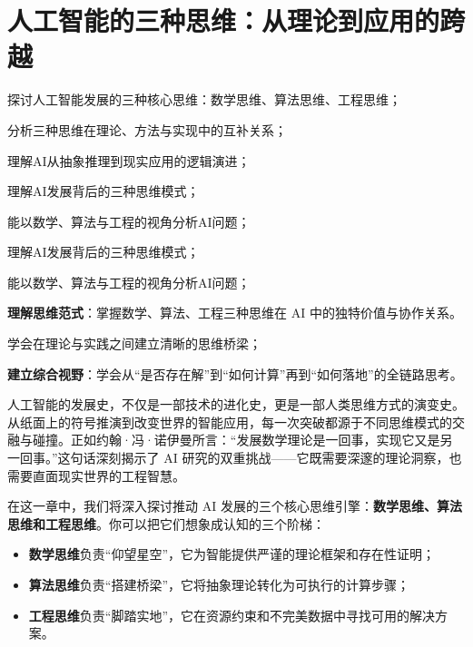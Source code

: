 \chapter{人工智能的三种思维：从理论到应用的跨越}



\begin{introduction}
  \item 探讨人工智能发展的三种核心思维：数学思维、算法思维、工程思维；
  \item 分析三种思维在理论、方法与实现中的互补关系；
  \item 理解AI从抽象推理到现实应用的逻辑演进；
  \item  理解AI发展背后的三种思维模式；
  \item 能以数学、算法与工程的视角分析AI问题；
\end{introduction}

\begin{introduction}
  \item 理解AI发展背后的三种思维模式；
  \item 能以数学、算法与工程的视角分析AI问题；
  \item \textbf{理解思维范式}：掌握数学、算法、工程三种思维在 AI 中的独特价值与协作关系。 
  \item 学会在理论与实践之间建立清晰的思维桥梁；
  \item \textbf{建立综合视野}：学会从“是否存在解”到“如何计算”再到“如何落地”的全链路思考。
  \item   \item 
\end{introduction}

人工智能的发展史，不仅是一部技术的进化史，更是一部人类思维方式的演变史。从纸面上的符号推演到改变世界的智能应用，每一次突破都源于不同思维模式的交融与碰撞。正如约翰·冯·诺伊曼所言：“发展数学理论是一回事，实现它又是另一回事。”这句话深刻揭示了 AI 研究的双重挑战——它既需要深邃的理论洞察，也需要直面现实世界的工程智慧。

在这一章中，我们将深入探讨推动 AI 发展的三个核心思维引擎：\textbf{数学思维、算法思维和工程思维}。你可以把它们想象成认知的三个阶梯： 
\begin{itemize} 
  \item \textbf{数学思维}负责“仰望星空”，它为智能提供严谨的理论框架和存在性证明； 
  \item \textbf{算法思维}负责“搭建桥梁”，它将抽象理论转化为可执行的计算步骤； 
  \item \textbf{工程思维}负责“脚踏实地”，它在资源约束和不完美数据中寻找可用的解决方案。 
\end{itemize}

